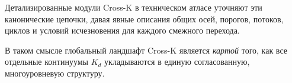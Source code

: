 Детализированные модули Cross-K в техническом атласе уточняют эти
канонические цепочки, давая явные описания общих осей, порогов, потоков,
циклов и условий исчезновения для каждого смежного перехода.

В таком смысле глобальный ландшафт Cross-K является \emph{картой} того,
как все отдельные континуумы $K_d$ укладываются в единую согласованную,
многоуровневую структуру.
